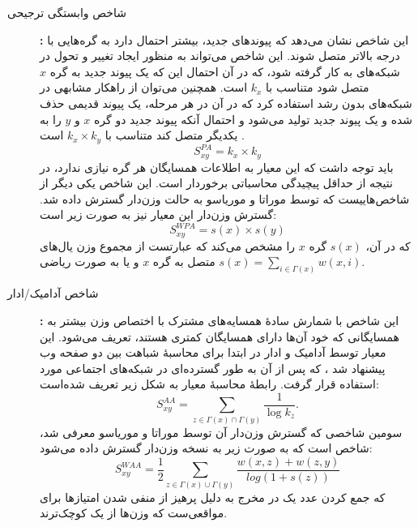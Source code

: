 \begin{description}
\item[شاخص وابستگی ترجیحی ]\textbf{:}
این شاخص نشان می‌دهد که پیوندهای جدید، بیشتر احتمال دارد به گره‌هایی با درجه بالاتر متصل شوند. این شاخص می‌تواند به منظور ایجاد تغییر و تحول در شبکه‌های \ScaleFree به کار گرفته شود، که در آن احتمال این که یک پیوند جدید به گره $x$ متصل شود متناسب با $k_{x}$ است. همچنین می‌توان از راهکار مشابهی در شبکه‌های \ScaleFree بدون رشد استفاده کرد که در آن در هر مرحله، یک پیوند قدیمی حذف شده‌ و یک پیوند جدید تولید می‌شود و احتمال آنکه پیوند جدید دو گره $x$ و $y$ را به یکدیگر متصل کند متناسب با $k_{x} \times k_{y}$ است \cite{newman2001clustering}.
\begin{equation}
S_{xy}^{PA}=k_{x}\times k_{y}
\end{equation}
باید توجه داشت که این معیار به اطلاعات همسایگان هر گره نیازی ندارد، در نتیجه از حداقل پیچیدگی محاسباتی برخوردار است. این شاخص یکی دیگر از شاخص‌هاییست که توسط موراتا و موریاسو به حالت وزن‌دار گسترش داده شد. گسترش وزن‌دار این معیار نیز به صورت زیر است:
\begin{equation}
S_{xy}^{WPA} = s(x) \times s(y)
\end{equation}
که در آن، $s(x)$ \Strength{} گره $x$ را مشخص می‌کند که عبارتست از مجموع وزن یال‌های متصل به گره $x$ و یا به صورت ریاضی
$s(x) = \sum_{i\in\Gamma(x)}{w(x,i)}$.

\item[شاخص آدامیک/ادار ]\textbf{:}
این شاخص با شمارش سادهٔ همسایه‌های مشترک با اختصاص وزن بیشتر به همسایگانی که خود آن‌ها دارای همسایگان کمتری هستند، تعریف می‌شود. این معیار توسط آدامیک و ادار در ابتدا برای محاسبهٔ شباهت بین دو صفحه وب پیشنهاد شد \cite{adamic2003friends}، که پس از آن به طور گسترده‌ای در شبکه‌های اجتماعی مورد استفاده قرار گرفت. رابطهٔ محاسبهٔ معیار  به شکل زیر تعریف شده‌است:
\begin{equation}
S_{xy}^{AA}= \sum_{z\in\Gamma(x)\cap\Gamma(y)}{\frac{1}{\log k_{z}}}.
\end{equation}
سومین شاخصی که گسترش وزن‌دار آن توسط موراتا و موریاسو معرفی شد، شاخص  است که به صورت زیر به نسخه وزن‌دار گسترش داده می‌شود:
\begin{equation}
 S_{xy}^{WAA} = \frac{1}{2}\sum_{z\in\Gamma(x)\cup\Gamma(y)}\frac{w(x,z)+w(z,y)}{log(1+s(z))}
\end{equation}
که جمع کردن عدد یک در مخرج به دلیل پرهیز از منفی شدن امتیازها برای مواقعی‌ست که وزن‌ها از یک کوچک‌ترند.


\end{description}
